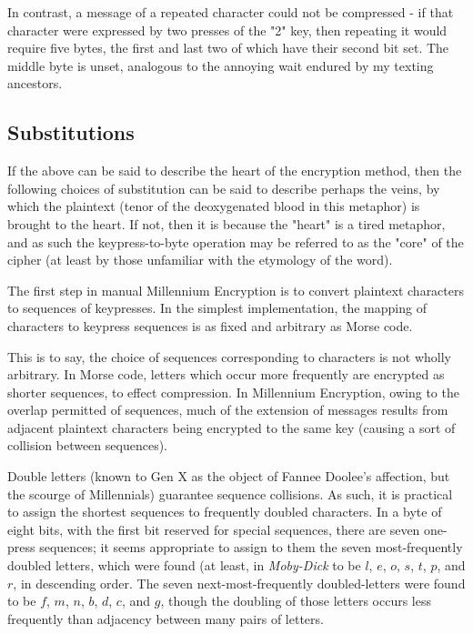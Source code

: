 \documentclass{article}
\begin{document}
In contrast, a message of a repeated character could not be compressed - if that character were expressed by two presses of the "2" key, then repeating it would require five bytes, the first and last two of which have their second bit set.  The middle byte is unset, analogous to the annoying wait endured by my texting ancestors.

\subsection{Substitutions}
If the above can be said to describe the heart of the encryption method, then the following choices of substitution can be said to describe perhaps the veins, by which the plaintext (tenor of the deoxygenated blood in this metaphor) is brought to the heart.  If not, then it is because the "heart" is a tired metaphor, and as such the keypress-to-byte operation may be referred to as the "core" of the cipher (at least by those unfamiliar with the etymology of the word).

The first step in manual Millennium Encryption is to convert plaintext characters to sequences of keypresses.  In the simplest implementation, the mapping of characters to keypress sequences is as fixed and arbitrary as Morse code.

This is to say, the choice of sequences corresponding to characters is not wholly arbitrary.  In Morse code, letters which occur more frequently are encrypted as shorter sequences, to effect compression.  In Millennium Encryption, owing to the overlap permitted of sequences, much of the extension of messages results from adjacent plaintext characters being encrypted to the same key (causing a sort of collision between sequences).

Double letters (known to Gen X as the object of Fannee Doolee's affection, but the scourge of Millennials) guarantee sequence collisions.  As such, it is practical to assign the shortest sequences to frequently doubled characters.  In a byte of eight bits, with the first bit reserved for special sequences, there are seven one-press sequences; it seems appropriate to assign to them the seven most-frequently doubled letters, which were found (at least, in \textit{Moby-Dick} to be $l$, $e$, $o$, $s$, $t$, $p$, and $r$, in descending order.  The seven next-most-frequently doubled-letters were found to be $f$, $m$, $n$, $b$, $d$, $c$, and $g$, though the doubling of those letters occurs less frequently than adjacency between many pairs of letters.
\end{document}
